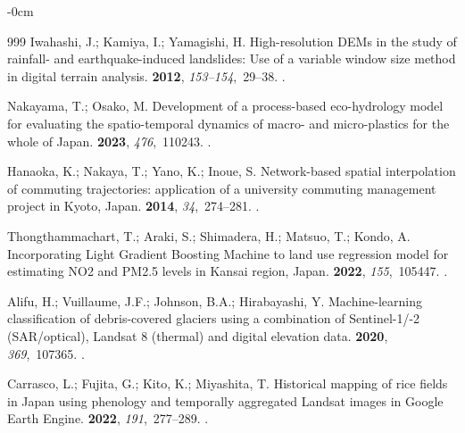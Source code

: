 \documentclass[land,article,accept,pdftex,moreauthors]{Definitions/mdpi}
\begin{document}
\begin{adjustwidth}{-\extralength}{0cm}
\begin{thebibliography}{999}
Iwahashi, J.; Kamiya, I.; Yamagishi, H.
\newblock High-resolution DEMs in the study of rainfall- and earthquake-induced
  landslides: Use of a variable window size method in digital terrain analysis.
 {\bf 2012}, {\em 153--154},~29--38.\linebreak
{}.

Nakayama, T.; Osako, M.
\newblock Development of a process-based eco-hydrology model for evaluating the
  spatio-temporal dynamics of macro- and micro-plastics for the whole of Japan.
 {\bf 2023}, {\em 476},~110243.
.

Hanaoka, K.; Nakaya, T.; Yano, K.; Inoue, S.
\newblock Network-based spatial interpolation of commuting trajectories:
  application of a university commuting management project in Kyoto, Japan.
 {\bf 2014}, {\em 34},~274--281.\linebreak
{}.

Thongthammachart, T.; Araki, S.; Shimadera, H.; Matsuo, T.; Kondo, A.
\newblock Incorporating Light Gradient Boosting Machine to land use regression
  model for estimating NO2 and PM2.5 levels in Kansai region, Japan.
 {\bf 2022}, {\em
  155},~105447.
.

Alifu, H.; Vuillaume, J.F.; Johnson, B.A.; Hirabayashi, Y.
\newblock Machine-learning classification of debris-covered glaciers using a
  combination of Sentinel-1/-2 (SAR/optical), Landsat 8 (thermal) and digital
  elevation data.
 {\bf 2020}, {\em 369},~107365.
.

Carrasco, L.; Fujita, G.; Kito, K.; Miyashita, T.
\newblock Historical mapping of rice fields in Japan using phenology and
  temporally aggregated Landsat images in Google Earth Engine.
 {\bf 2022},
  {\em 191},~277--289.
.


\end{thebibliography}
\end{adjustwidth}
\end{document}
